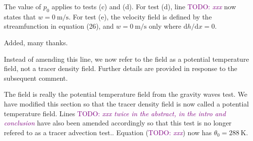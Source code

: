 \documentclass{article}
\newcommand{\TODO}[1]{\textcolor{purple}{TODO: \emph{#1}}}
\begin{document}
\begin{quotation}
	\begin{comment}
	\item Test d) and e): As for test c), the descriptions of the initial conditions looks incomplete. Is the initial w zero in d,e?
\end{comment}
\end{quotation}
The value of $p_0$ applies to tests (c) and (d).  For test (d), line \TODO{xxx} now states that $w = \SI{0}{\meter\per\second}$.  For test (e), the velocity field is defined by the streamfunction in equation (26), and $w = \SI{0}{\meter\per\second}$ only where $\mathrm{d}h/\mathrm{d}x = 0$.

\begin{quotation}
	\begin{comment}
	\item Line 389: mu needs the physical unit 1/s.
\end{comment}
\end{quotation}
Added, many thanks.

\begin{quotation}
	\begin{comment}
	\item Line 440: It would be better to say 'The functional form of the initial density field ...potential temperature field (Eq. (22)) in the gravity wave test.
	\end{comment}
\end{quotation}
Instead of amending this line, we now refer to the field as a potential temperature field, not a tracer density field.  Further details are provided in response to the subsequent comment.

\begin{quotation}
	\begin{comment}
	\item Line 445: While it is mathematically possible to initialize the tracer density with 288 (needs physical units!) at the ground, it does not make any physical sense. However, it is okay to leave it for this idealized test case, but a more physical choice is clearly more desirable.
	\end{comment}
\end{quotation}
The field is really the potential temperature field from the gravity waves test.  We have modified this section so that the tracer density field is now called a potential temperature field.  Lines \TODO{xxx twice in the abstract, in the intro and conclusion} have also been amended accordingly so that this test is no longer refered to as a tracer advection test..  Equation (\TODO{xxx}) now has $\theta_0 = \SI{288}{\kelvin}$.
\end{document}
